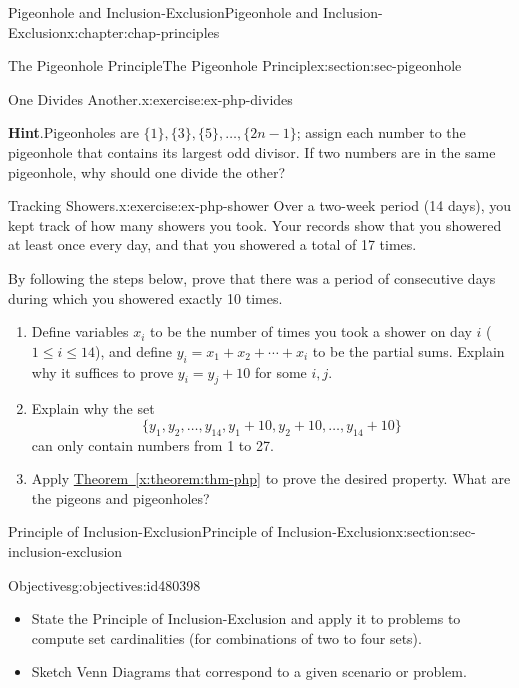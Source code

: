 \documentclass[oneside,10pt,]{book}
\newcommand{\blocktitlefont}{\relax}
\newcommand{\xreffont}{\relax}
\numberwithin{equation}{section}
\begin{document}
\begin{chapterptx}{Pigeonhole and Inclusion-Exclusion}{}{Pigeonhole and Inclusion-Exclusion}{}{}{x:chapter:chap-principles}
\begin{sectionptx}{The Pigeonhole Principle}{}{The Pigeonhole Principle}{}{}{x:section:sec-pigeonhole}
\begin{inlineexercise}{One Divides Another.}{x:exercise:ex-php-divides}
\par\smallskip%
\noindent\textbf{\blocktitlefont Hint}.\hypertarget{g:hint:id480123}{}\quad{}Pigeonholes are \(\{1\},\{3\},\{5\},\ldots,\{2n-1\}\); assign each number to the pigeonhole that contains its largest odd divisor. If two numbers are in the same pigeonhole, why should one divide the other?%
\end{inlineexercise}
\begin{inlineexercise}{Tracking Showers.}{x:exercise:ex-php-shower}%
Over a two-week period (14 days), you kept track of how many showers you took. Your records show that you showered at least once every day, and that you showered a total of 17 times.%
\par
By following the steps below, prove that there was a period of consecutive days during which you showered exactly 10 times.%
\begin{enumerate}[label=(\alph*)]
\item{}Define variables \(x_i\) to be the number of times you took a shower on day \(i\) (\(1 \leq i \leq 14\)), and define \(y_i = x_1 + x_2 + \cdots + x_i\) to be the partial sums. Explain why it suffices to prove \(y_i = y_j + 10\) for some \(i,j\).%
\item{}Explain why the set%
\begin{equation*}
\{y_1,y_2,\ldots,y_{14},y_1+10,y_2+10,\ldots,y_{14}+10\}
\end{equation*}
can only contain numbers from 1 to 27.%
\item{}Apply \hyperref[x:theorem:thm-php]{Theorem~{\xreffont\ref{x:theorem:thm-php}}} to prove the desired property. What are the pigeons and pigeonholes?%
\end{enumerate}
%
\end{inlineexercise}
\end{sectionptx}
%
%
\typeout{************************************************}
\typeout{************************************************}
%
\begin{sectionptx}{Principle of Inclusion-Exclusion}{}{Principle of Inclusion-Exclusion}{}{}{x:section:sec-inclusion-exclusion}
\begin{objectives}{Objectives}{g:objectives:id480398}
%
\begin{itemize}[label=\textbullet]
\item{}State the Principle of Inclusion-Exclusion and apply it to problems to compute set cardinalities (for combinations of two to four sets).%
\item{}Sketch Venn Diagrams that correspond to a given scenario or problem.%

\end{itemize}
\end{objectives}
\end{sectionptx}
\end{chapterptx}
\end{document}
